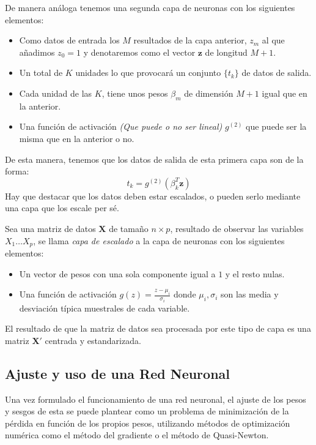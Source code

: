 \noindent De manera análoga tenemos una segunda capa de neuronas con los siguientes elementos:
\begin{itemize}
\item Como datos de entrada los $M$ resultados de la capa anterior, $z_m$ al que añadimos $z_0=1$ y denotaremos como el vector $\textbf{z}$ de longitud $M+1$.
\item Un total de $K$ unidades lo que provocará un conjunto $\lbrace t_k \rbrace$ de datos de salida.
\item Cada unidad de las $K$, tiene unos pesos $\beta_m$ de dimensión $M+1$ igual que en la anterior. 
\item Una función de activación \textit{(Que puede o no ser lineal)} $g^{(2)}$ que puede ser la misma que en la anterior o no.
\end{itemize}
\noindent De esta manera, tenemos que los datos de salida de esta primera capa son de la forma:
\begin{equation}
t_k=g^{(2)}(\beta_k^T\textbf{z})
\end{equation}
\noindent Hay que destacar que los datos deben estar escalados, o pueden serlo mediante una capa que los escale per sé.

\begin{defi}
Sea una matriz de datos $\textbf{X}$ de tamaño $n\times p$, resultado de observar las variables $X_1 \ldots X_p$, se llama \textit{capa de escalado} a la capa de neuronas con los siguientes elementos:
\begin{itemize}
\item Un vector de pesos con una sola componente igual a $1$ y el resto nulas. 
\item Una función de activación $g(z)=\frac{z-\mu_i}{\sigma_i}$ donde $\mu_i, \sigma_i$ son las media y desviación típica muestrales de cada variable.
\end{itemize}
\noindent El resultado de que la matriz de datos sea procesada por este tipo de capa es una matriz $\textbf{X}'$ centrada y estandarizada. 
\end{defi}

\subsection{Ajuste y uso de una Red Neuronal}

\noindent Una vez formulado el funcionamiento de una red neuronal, el ajuste de los pesos y sesgos de esta se puede plantear como un problema de minimización de la pérdida en función de los propios pesos, utilizando métodos de optimización numérica como el método del gradiente o el método de Quasi-Newton. 

